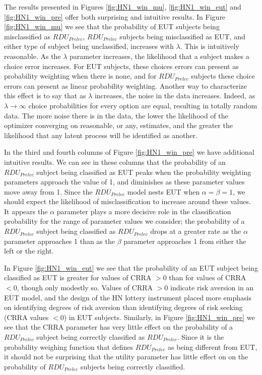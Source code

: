 \documentclass[../main.tex]{subfiles}
\begin{document}
The results presented in Figures \ref{fig:HN1_win_mu}, \ref{fig:HN1_win_eut} and \ref{fig:HN1_win_pre} offer both surprising and intuitive results.
In Figure \ref{fig:HN1_win_mu} we see that the probability of EUT subjects being misclassified as $\mathit{RDU_{Prelec}}$, $\mathit{RDU_{Prelec}}$ subjects being misclassified as EUT, and either type of subject being unclassified, increases with $\lambda$.
This is intuitively reasonable.
As the $\lambda$ parameter increases, the likelihood that a subject makes a choice error increases.
For EUT subjects, these choices errors can present as probability weighting when there is none, and for $\mathit{RDU_{Prelec}}$ subjects these choice errors can present as linear probability weighting.
Another way to characterize this effect is to say that as $\lambda$ increases, the noise in the data increases.
Indeed, as $\lambda \to \infty$ choice probabilities for every option are equal, resulting in totally random data.
The more noise there is in the data, the lower the likelihood of the optimizer converging on reasonable, or any, estimates, and the greater the likelihood that any latent process will be identified as another.

In the third and fourth columns of Figure \ref{fig:HN1_win_pre} we have additional intuitive results.
We can see in these columns that the probability of an $\mathit{RDU_{Prelec}}$ subject being classified as EUT peaks when the probability weighting parameters approach the value of 1, and diminishes as these parameter values move away from 1.
Since the $\mathit{RDU_{Prelec}}$ model nests EUT when $\alpha = \beta = 1$, we should expect the likelihood of misclassification to increase around these values.
It appears the $\alpha$ parameter plays a more decisive role in the classification probability for the range of parameter values we consider; the probability of a $\mathit{RDU_{Prelec}}$ subject being classified as $\mathit{RDU_{Prelec}}$ drops at a greater rate as the $\alpha$ parameter approaches 1 than as the $\beta$ parameter approaches 1 from either the left or the right.

In Figure \ref{fig:HN1_win_eut} we see that the probability of an EUT subject being classified as EUT is greater for values of CRRA $> 0$ than for values of CRRA $< 0$, though only modestly so.
Values of CRRA $> 0$ indicate risk aversion in an EUT model, and the design of the HN lottery instrument placed more emphasis on identifying degrees of risk aversion than identifying degrees of risk seeking (CRRA values $ < 0$) in EUT subjects.
Similarly, in Figure \ref{fig:HN1_win_pre} we see that the CRRA parameter has very little effect on the probability of a $\mathit{RDU_{Prelec}}$ subject being correctly classified as $\mathit{RDU_{Prelec}}$.
Since it is the probability weighing function that defines $\mathit{RDU_{Prelec}}$ as being different from EUT, it should not be surprising that the utility parameter has little effect on on the probability of $\mathit{RDU_{Prelec}}$ subjects being correctly classified.
\end{document}

